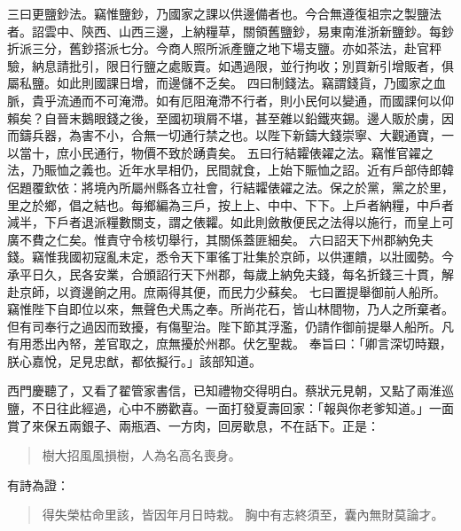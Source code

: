 三曰更鹽鈔法。竊惟鹽鈔，乃國家之課以供邊備者也。今合無遵復祖宗之製鹽法者。詔雲中、陝西、山西三邊，上納糧草，關領舊鹽鈔，易東南淮浙新鹽鈔。每鈔折派三分，舊鈔搭派七分。今商人照所派產鹽之地下場支鹽。亦如茶法，赴官秤驗，納息請批引，限日行鹽之處販賣。如遇過限，並行拘收；別買新引增販者，俱屬私鹽。如此則國課日增，而邊儲不乏矣。
四曰制錢法。竊謂錢貨，乃國家之血脈，貴乎流通而不可淹滯。如有厄阻淹滯不行者，則小民何以變通，而國課何以仰賴矣？自晉末鵝眼錢之後，至國初瑣屑不堪，甚至雜以鉛鐵夾錫。邊人販於虜，因而鑄兵器，為害不小，合無一切通行禁之也。以陛下新鑄大錢崇寧、大觀通寶，一以當十，庶小民通行，物價不致於踴貴矣。
五曰行結糶俵糴之法。竊惟官糴之法，乃賑恤之義也。近年水旱相仍，民間就食，上始下賑恤之詔。近有戶部侍郎韓侶題覆欽依：將境內所屬州縣各立社會，行結糶俵糴之法。保之於黨，黨之於里，里之於鄉，倡之結也。每鄉編為三戶，按上上、中中、下下。上戶者納糧，中戶者減半，下戶者退派糧數關支，謂之俵糶。如此則斂散便民之法得以施行，而皇上可廣不費之仁矣。惟責守令核切舉行，其關係蓋匪細矣。
六曰詔天下州郡納免夫錢。竊惟我國初寇亂未定，悉令天下軍徭丁壯集於京師，以供運饋，以壯國勢。今承平日久，民各安業，合頒詔行天下州郡，每歲上納免夫錢，每名折錢三十貫，解赴京師，以資邊餉之用。庶兩得其便，而民力少蘇矣。
七曰置提舉御前人船所。竊惟陛下自即位以來，無聲色犬馬之奉。所尚花石，皆山林間物，乃人之所棄者。但有司奉行之過因而致擾，有傷聖治。陛下節其浮濫，仍請作御前提舉人船所。凡有用悉出內帑，差官取之，庶無擾於州郡。伏乞聖裁。
奉旨曰：「卿言深切時艱，朕心嘉悅，足見忠猷，都依擬行。」該部知道。

西門慶聽了，又看了翟管家書信，已知禮物交得明白。蔡狀元見朝，又點了兩淮巡鹽，不日往此經過，心中不勝歡喜。一面打發夏壽回家：「報與你老爹知道。」一面賞了來保五兩銀子、兩瓶酒、一方肉，回房歇息，不在話下。正是：
\begin{quote}
樹大招風風損樹，人為名高名喪身。
\end{quote}
有詩為證：
\begin{quote}
得失榮枯命里該，皆因年月日時栽。
胸中有志終須至，囊內無財莫論才。
\end{quote}
